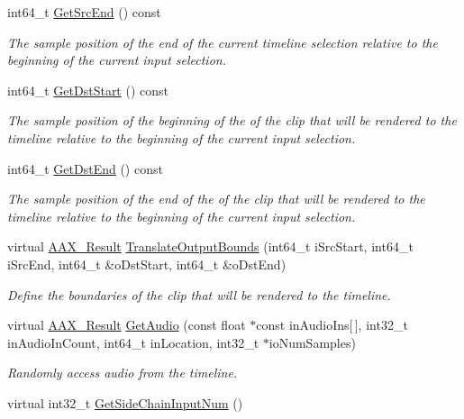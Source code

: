 \begin{DoxyCompactItemize}
int64\+\_\+t \hyperlink{a00020_a5ec16926f70c9a6189d0cc8c06b42124}{Get\+Src\+End} () const 
\begin{DoxyCompactList}\small\item\em The sample position of the end of the current timeline selection relative to the beginning of the current input selection. \end{DoxyCompactList}\item 
int64\+\_\+t \hyperlink{a00020_a4a9cc5ac5011227b1d3355a751659236}{Get\+Dst\+Start} () const 
\begin{DoxyCompactList}\small\item\em The sample position of the beginning of the of the clip that will be rendered to the timeline relative to the beginning of the current input selection. \end{DoxyCompactList}\item 
int64\+\_\+t \hyperlink{a00020_acf7ac84262e9141598c7b7dad0355467}{Get\+Dst\+End} () const 
\begin{DoxyCompactList}\small\item\em The sample position of the end of the of the clip that will be rendered to the timeline relative to the beginning of the current input selection. \end{DoxyCompactList}\item 
virtual \hyperlink{a00149_a4d8f69a697df7f70c3a8e9b8ee130d2f}{A\+A\+X\+\_\+\+Result} \hyperlink{a00020_a4d793e60071069e6f98c4d841d37ac96}{Translate\+Output\+Bounds} (int64\+\_\+t i\+Src\+Start, int64\+\_\+t i\+Src\+End, int64\+\_\+t \&o\+Dst\+Start, int64\+\_\+t \&o\+Dst\+End)
\begin{DoxyCompactList}\small\item\em Define the boundaries of the clip that will be rendered to the timeline. \end{DoxyCompactList}\item 
virtual \hyperlink{a00149_a4d8f69a697df7f70c3a8e9b8ee130d2f}{A\+A\+X\+\_\+\+Result} \hyperlink{a00020_a44b4889c96aeced88596cfbb9863eabe}{Get\+Audio} (const float $\ast$const in\+Audio\+Ins\mbox{[}$\,$\mbox{]}, int32\+\_\+t in\+Audio\+In\+Count, int64\+\_\+t in\+Location, int32\+\_\+t $\ast$io\+Num\+Samples)
\begin{DoxyCompactList}\small\item\em Randomly access audio from the timeline. \end{DoxyCompactList}\item 
virtual int32\+\_\+t \hyperlink{a00020_a55aeb268e1312ddba1989e37cace823f}{Get\+Side\+Chain\+Input\+Num} ()

\end{DoxyCompactItemize}
